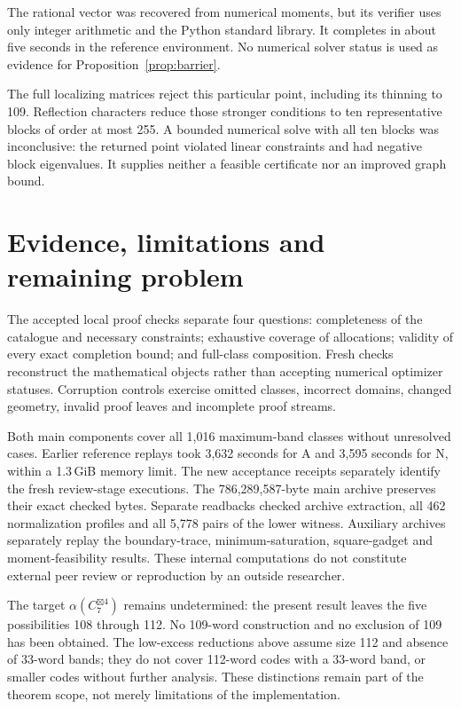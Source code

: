 \documentclass[11pt]{article}
\theoremstyle{definition}
\newcommand{\G}[1]{C_7^{\boxtimes #1}}
\begin{document}
The rational vector was recovered from numerical moments, but its verifier
uses only integer arithmetic and the Python standard library. It completes
in about five seconds in the reference environment. No numerical solver
status is used as evidence for Proposition~\ref{prop:barrier}.

The full localizing matrices reject this particular point, including its
thinning to 109. Reflection characters reduce those stronger conditions
to ten representative blocks of order at most 255. A bounded numerical
solve with all ten blocks was inconclusive: the returned point violated
linear constraints and had negative block eigenvalues. It supplies
neither a feasible certificate nor an improved graph bound.

\section{Evidence, limitations and remaining problem}
The accepted local proof checks separate four questions: completeness
of the catalogue and necessary constraints; exhaustive coverage of
allocations; validity of every exact completion bound; and full-class
composition. Fresh checks reconstruct the mathematical objects rather
than accepting numerical optimizer statuses. Corruption controls
exercise omitted classes, incorrect domains, changed geometry, invalid
proof leaves and incomplete proof streams.

Both main components cover all 1,016 maximum-band classes without
unresolved cases. Earlier reference replays took 3,632 seconds for A and
3,595 seconds for N, within a 1.3\,GiB memory limit. The new acceptance
receipts separately identify the fresh review-stage executions. The 786,289,587-byte
main archive preserves their exact checked bytes. Separate readbacks checked
archive extraction, all 462 normalization profiles and all 5,778 pairs of
the lower witness. Auxiliary archives separately replay the boundary-trace,
minimum-saturation, square-gadget and moment-feasibility results. These
internal computations do not constitute external peer review or reproduction
by an outside researcher.

The target $\alpha(\G4)$ remains undetermined: the present result leaves
the five possibilities 108 through 112. No 109-word construction and no
exclusion of 109 has been obtained. The low-excess reductions above
assume size 112 and absence of 33-word bands; they do not cover 112-word
codes with a 33-word band, or smaller codes without further analysis.
These distinctions remain part of the theorem scope, not merely
limitations of the implementation.
\end{document}
